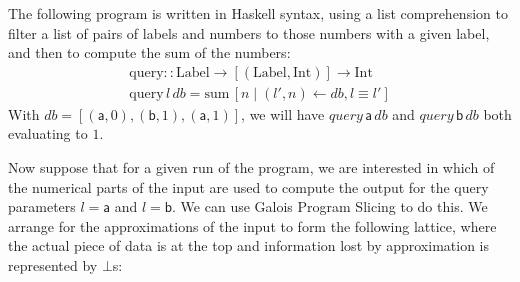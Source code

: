 \begin{example}
  The following program is written in Haskell \cite{haskell} syntax, using a list comprehension to filter a list of pairs of labels and numbers to those numbers with a given label, and then to compute the sum of the numbers:
  \begin{displaymath}
    \begin{array}{l}
      \mathrm{query} :: \mathrm{Label} \to [(\mathrm{Label}, \mathrm{Int})] \to \mathrm{Int} \\
      \mathrm{query}\,l\,\mathit{db} = \mathrm{sum}\,[ n \mid (l',n) \leftarrow \mathit{db}, l \equiv l' ]
    \end{array}
  \end{displaymath}
  With $\mathit{db} = [(\mathsf{a}, 0), (\mathsf{b}, 1), (\mathsf{a}, 1)]$, we will have $\mathit{query}\,\mathsf{a}\,\mathit{db}$ and $\mathit{query}\,\mathsf{b}\,\mathit{db}$ both evaluating to $1$.

  Now suppose that for a given run of the program, we are interested in which of the numerical parts of the input are used to compute the output for the query parameters $l = \mathsf{a}$ and $l = \mathsf{b}$. We can use Galois Program Slicing to do this. We arrange for the approximations of the input to form the following lattice, where the actual piece of data is at the top and information lost by approximation is represented by $\bot$s:
  \begin{center}
\end{center}
\end{example}
